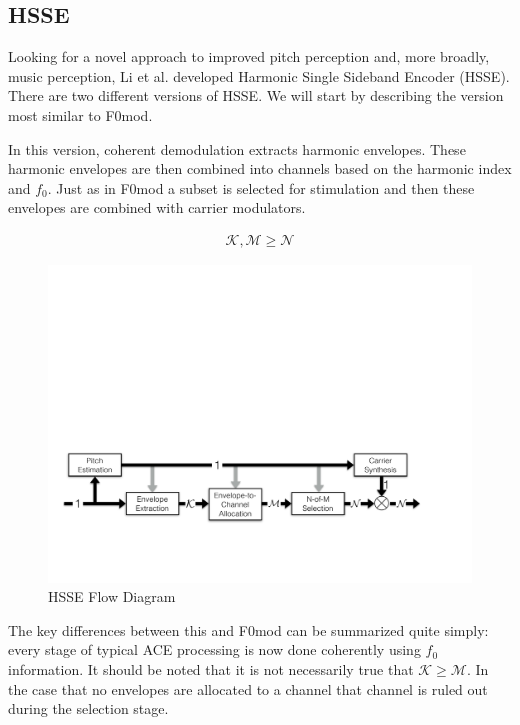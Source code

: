 \documentclass [11pt, proquest,oneside] {ganter_thesis}[2015/03/03]
\begin{document}
\subsection{HSSE}

Looking for a novel approach to improved pitch perception and, more broadly, music perception, Li et al. \cite{li2010harmonic} developed Harmonic Single Sideband Encoder (HSSE).  There are two different versions of HSSE.  We will start by describing the version most similar to F0mod.

In this version, coherent demodulation extracts harmonic envelopes.  These harmonic envelopes are then combined into channels based on the harmonic index and $f_0$.  Just as in F0mod a subset is selected for stimulation and then these envelopes are combined with carrier modulators.

\begin{align}
\mathcal{K}, \mathcal{M} \geq \mathcal{N} \nonumber
\end{align}

\begin{figure}[!ht]
  \centering
    \includegraphics[width=1\textwidth]{HSSE_flow_diagram_noPhase}   
    \caption{HSSE Flow Diagram}\label{fig:HSSE_flow_1}
\end{figure}

The key differences between this and F0mod can be summarized quite simply: every stage of typical ACE processing is now done coherently using $f_0$ information.  It should be noted that it is not necessarily true that $\mathcal{K} \geq \mathcal{M}$.  In the case that no envelopes are allocated to a channel that channel is  ruled out during the selection stage.
\end{document}
